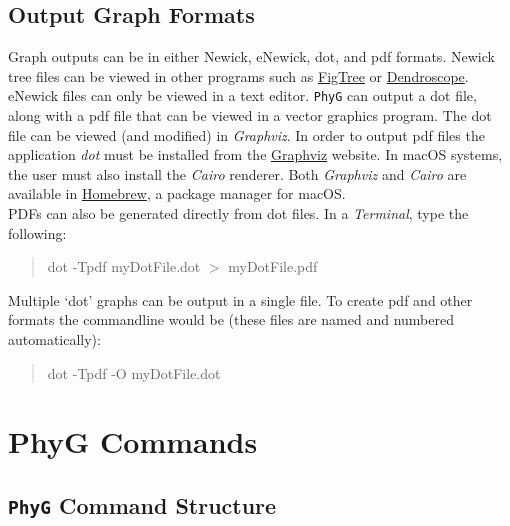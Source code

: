 \documentclass[11pt]{book}
\newcommand{\phyg}{\texttt{PhyG} }
\begin{document}
{{\section{Output Graph Formats}
\label{sec:outputgraphs}
	Graph outputs can be in either Newick, eNewick, dot, and pdf formats. Newick 
	tree files can be viewed in other programs such as \href{http://tree.bio.ed.ac.uk/software/figtree/}
	{FigTree} or \href{https://uni-tuebingen.de/fakultaeten/mathematisch-naturwissenschaftliche-fakultaet/fachbereiche/informatik/lehrstuehle/algorithms-in-bioinformatics/software/dendroscope/}{Dendroscope}. 		
	eNewick files can only be viewed in a text editor. \phyg can output a dot 
	file, along with a pdf file that can be viewed in a vector graphics program. The dot file can 
	be viewed (and modified) in \textit{Graphviz}. In order to output pdf files the application 
	\textit{dot} must be installed from the \href{https://graphviz.org/download/}{Graphviz} website. 
	In macOS systems, the user must also install the \textit{Cairo} renderer. Both \textit{Graphviz} 
	and \textit{Cairo} are available in \href{https://brew.sh/}{Homebrew}, a package manager 
	for macOS.\\

	\noindent PDFs can also be generated directly from dot files. In a \textit{Terminal}, 
	type the following: 

	\begin{quote}
	dot -Tpdf myDotFile.dot $>$ myDotFile.pdf
	\end{quote}
		
	\noindent Multiple `dot' graphs can be output in a single file. To create pdf and 
	other formats the commandline would be (these files are named and numbered 
	automatically):
	
	\begin{quote}
	dot -Tpdf -O myDotFile.dot
	\end{quote}


	
\chapter{PhyG Commands}

\section{\phyg Command Structure}
		 
}}
\end{document}
